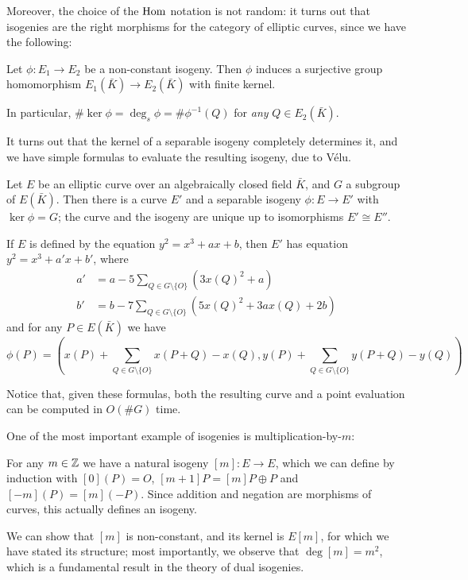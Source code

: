 Moreover, the choice of the $\operatorname{Hom}$ notation is not random: it turns out that isogenies are the right morphisms for the category of elliptic curves, since we have the following:
\begin{proposition}
    Let $\phi:E_1 \to E_2$ be a non-constant isogeny. Then $\phi$ induces a surjective group homomorphism $E_1(\bar K)\to E_2(\bar K)$ with finite kernel.
    
    In particular, $\#\ker \phi = \deg_s\phi = \#\phi^{-1}(Q)$ for \emph{any} $Q\in E_2(\bar K)$.
\end{proposition}

It turns out that the kernel of a separable isogeny completely determines it, and we have simple formulas to evaluate the resulting isogeny, due to Vélu.
\begin{proposition}
    Let $E$ be an elliptic curve over an algebraically closed field $\bar K$, and $G$ a subgroup of $E(\bar K)$. Then there is a curve $E'$ and a separable isogeny $\phi:E\to E'$ with $\ker\phi=G$; the curve and the isogeny are unique up to isomorphisms $E'\cong E''$.
    
    If $E$ is defined by the equation $y^2=x^3+ax+b$, then $E'$ has equation $y^2=x^3+a'x+b'$, where
    \begin{align*}
    a' &= a-5\sum_{Q\in G\setminus\{O\}}(3x(Q)^2+a)\\
    b' &= b-7\sum_{Q\in G\setminus\{O\}}(5x(Q)^2+3ax(Q)+2b)
    \end{align*}
    and for any $P\in E(\bar K)$ we have
    $$\phi(P) = \left(x(P) + \sum_{Q\in G\setminus\{O\}} x(P+Q)-x(Q), y(P)+ \sum_{Q\in G\setminus\{O\}} y(P+Q)-y(Q)\right)$$
\end{proposition}

Notice that, given these formulas, both the resulting curve and a point evaluation can be computed in $O(\# G)$ time.

One of the most important example of isogenies is multiplication-by-$m$:
\begin{example}
    For any $m\in\mathbb{Z}$ we have a natural isogeny $[m]:E\to E$, which we can define by induction with $[0](P)=O$, $[m+1]P=[m]P\oplus P$ and $[-m](P)=[m](-P)$. Since addition and negation are morphisms of curves, this actually defines an isogeny.
    
    We can show that $[m]$ is non-constant, and its kernel is $E[m]$, for which we have stated its structure; most importantly, we observe that $\deg[m]=m^2$, which is a fundamental result in the theory of dual isogenies.
\end{example}

